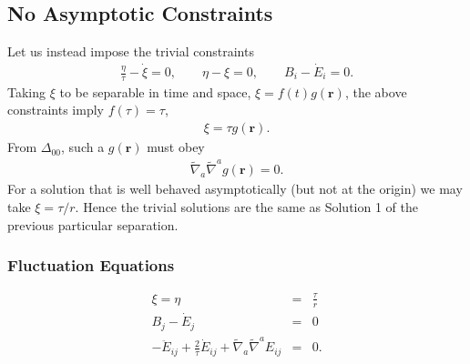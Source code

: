 \documentclass[10pt,letterpaper]{article}
\numberwithin{equation}{section}
\begin{document}
\subsection{No Asymptotic Constraints}
Let us instead impose the trivial constraints
\begin{eqnarray}
\frac{\eta}{\tau} -\dot\xi = 0,\qquad \eta-\xi=0,\qquad B_i-\dot E_i=0.
\end{eqnarray}
Taking $\xi$ to be separable in time and space, $\xi = f(t)g(\mathbf r)$, the above constraints imply $f(\tau)=\tau$,
\begin{eqnarray}
\xi = \tau g(\mathbf r). 
\end{eqnarray}
From $\Delta_{00}$, such a $g(\mathbf r )$ must obey
\begin{eqnarray}
\tilde\nabla_a\tilde\nabla^a g(\mathbf r) = 0.
\end{eqnarray}
For a solution that is well behaved asymptotically (but not at the origin) we may take $\xi = \tau/r$. Hence the trivial solutions are the same as Solution 1 of the previous particular separation. 
%
%
\subsubsection{Fluctuation Equations}
\begin{eqnarray}
\xi = \eta&=& \frac{\tau}{r}
\nonumber\\
B_j-\dot E_j &=& 0
\nonumber\\
- \ddot E_{ij} + \frac{2}{\tau} \dot E_{ij} + \tilde\nabla_a\tilde\nabla^a E_{ij}  &=& 0.
\end{eqnarray}
\end{document}
